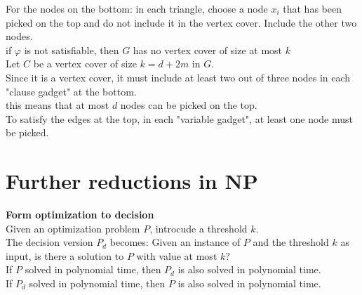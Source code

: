 \documentclass[onecolumn]{report}
\begin{document}
\indent \indent \indent For the nodes on the bottom: in each triangle, choose a node $x_i$ that has been picked on the top and do not include it in the vertex cover. Include the other two nodes.\\
\indent \indent if $\varphi$ is not satisfiable, then $G$ has no vertex cover of size at most $k$\\
\indent \indent \indent Let $C$ be a vertex cover of size $k = d + 2m$ in $G$.\\
\indent \indent \indent Since it is a vertex cover, it must include at least two out of three nodes in each "clause gadget" at the bottom.\\
\indent \indent \indent this means that at most $d$ nodes can be picked on the top.\\
\indent \indent \indent To satisfy the edges at the top, in each "variable gadget", at least one node must be picked.\\

\section{Further reductions in NP}
\textbf{Form optimization to decision}\\
Given an optimization problem $P$, introcude a threshold $k$.\\
The decision version $P_d$ becomes: Given an instance of $P$ and the threshold $k$ as input, is there a solution to $P$ with value at most $k$?\\
\indent If $P$ solved in polynomial time, then $P_d$ is also solved in polynomial time.\\
\indent If $P_d$ solved in polynomial time, then $P$ is also solved in polynomial time.\\
\end{document}
